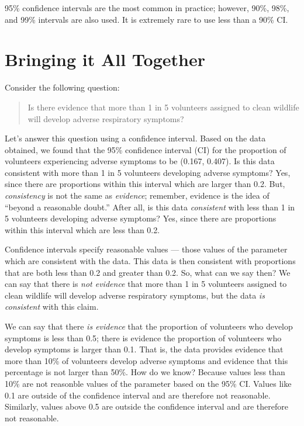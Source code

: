 \documentclass[]{book}
\theoremstyle{plain}
\theoremstyle{mydefn}
\theoremstyle{myexmpl}
\theoremstyle{remark}
\let\BeginKnitrBlock\begin \let\EndKnitrBlock\end
\let\BeginKnitrBlock\begin \let\EndKnitrBlock\end
\begin{document}
\BeginKnitrBlock{rmdtip}
95\% confidence intervals are the most common in practice; however,
90\%, 98\%, and 99\% intervals are also used. It is extremely rare to
use less than a 90\% CI.
\EndKnitrBlock{rmdtip}

\section{Bringing it All Together}\label{bringing-it-all-together}

Consider the following question:

\begin{quote}
Is there evidence that more than 1 in 5 volunteers assigned to clean
wildlife will develop adverse respiratory symptoms?
\end{quote}

Let's answer this question using a confidence interval. Based on the
data obtained, we found that the 95\% confidence interval (CI) for the
proportion of volunteers experiencing adverse symptoms to be (0.167,
0.407). Is this data consistent with more than 1 in 5 volunteers
developing adverse symptoms? Yes, since there are proportions within
this interval which are larger than 0.2. But, \emph{consistency} is not
the same as \emph{evidence}; remember, evidence is the idea of ``beyond
a reasonable doubt.'' After all, is this data \emph{consistent} with
less than 1 in 5 volunteers developing adverse symptoms? Yes, since
there are proportions within this interval which are less than 0.2.

Confidence intervals specify reasonable values --- those values of the
parameter which are consistent with the data. This data is then
consistent with proportions that are both less than 0.2 and greater than
0.2. So, what can we say then? We can say that there is \emph{not
evidence} that more than 1 in 5 volunteers assigned to clean wildlife
will develop adverse respiratory symptoms, but the data \emph{is
consistent} with this claim.

We can say that there \emph{is evidence} that the proportion of
volunteers who develop symptoms is less than 0.5; there is evidence the
proportion of volunteers who develop symptoms is larger than 0.1. That
is, the data provides evidence that more than 10\% of volunteers develop
adverse symptoms and evidence that this percentage is not larger than
50\%. How do we know? Because values less than 10\% are not reasonble
values of the parameter based on the 95\% CI. Values like 0.1 are
outside of the confidence interval and are therefore not reasonable.
Similarly, values above 0.5 are outside the confidence interval and are
therefore not reasonable.
\end{document}
